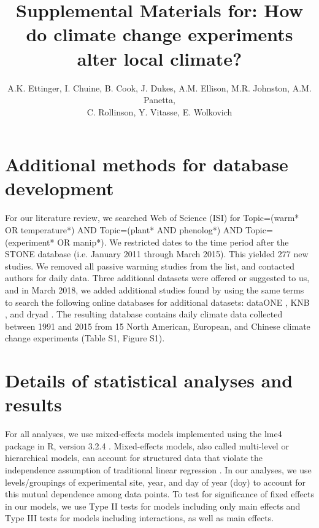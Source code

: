 \documentclass{article}
\begin{document}

\title{Supplemental Materials for: How do climate change experiments alter local climate?} %

\author{A.K. Ettinger, I. Chuine, B. Cook, J. Dukes, A.M. Ellison, M.R. Johnston, A.M. Panetta,\\ C. Rollinson, Y. Vitasse, E. Wolkovich}
\maketitle  %
\renewcommand{\thetable}{S\arabic{table}}
\renewcommand{\thefigure}{S\arabic{figure}}

\section* {Additional methods for database development}
For our literature review, we searched Web of Science (ISI) for Topic=(warm* OR temperature*) AND Topic=(plant* AND phenolog*) AND Topic=(experiment* OR manip*). We restricted dates to the time period after the STONE database (i.e. January 2011 through March 2015). This yielded 277 new studies. We removed all passive warming studies from the list, and contacted authors for daily data. Three additional datasets were offered or suggested to us, and in March 2018, we added additional studies found by using the same terms to search the following online databases for additional datasets: dataONE \citep{dataONE}, KNB \citep{knb}, and dryad \citep{dryad}. The resulting database contains daily climate data collected between 1991 and 2015 from 15 North American, European, and Chinese climate change experiments (Table S1, Figure S1). %

\section* {Details of statistical analyses and results}
For all analyses, we use mixed-effects models implemented using the lme4 package in R, version 3.2.4 \citep{bates2015,rcoreteam2016}. Mixed-effects models, also called multi-level or hierarchical models, can account for structured data that violate the independence assumption of traditional linear regression \citep{gelman2007}. In our analyses, we use levels/groupings of experimental site, year, and day of year (doy) to account for this mutual dependence among data points. To test for significance of fixed effects in our models, we use Type II tests for models including only main effects and Type III tests for models including interactions, as well as main effects. 
\end{document}

